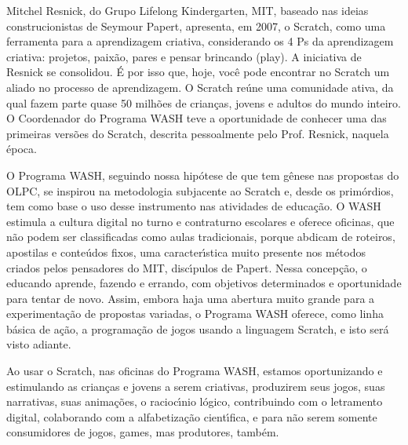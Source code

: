 \documentclass[
12pt,		%
openright,	%
twoside,  %
a4paper,			%
chapter=TITLE,		%
english,			%
french,				%
spanish,			%
brazil				%
]{USPSC-classe/USPSC}
\begin{document}
Mitchel Resnick, do Grupo Lifelong Kindergarten, MIT, baseado nas ideias construcionistas de Seymour Papert, apresenta, em 2007, o Scratch, como uma ferramenta para a aprendizagem criativa, considerando os 4 Ps da aprendizagem criativa: projetos, paix\~ao, pares e pensar brincando (play). A iniciativa de Resnick se consolidou. \'E por isso que, hoje, voc\^e pode encontrar no Scratch um aliado no processo de aprendizagem. O Scratch re\'une uma comunidade ativa, da qual fazem parte quase 50 milh\~oes de crian\c{c}as, jovens e adultos do mundo inteiro. O Coordenador do Programa WASH teve a oportunidade de conhecer uma das primeiras vers\~oes do Scratch, descrita pessoalmente pelo Prof. Resnick, naquela \'epoca.

















O Programa WASH, seguindo nossa hip\'otese de que tem g\^enese nas propostas do OLPC, se inspirou na metodologia subjacente ao Scratch e, desde os prim\'ordios, tem como base o uso desse instrumento nas atividades de educa\c{c}\~ao. O WASH estimula a cultura digital no turno e contraturno escolares e oferece oficinas, que n\~ao podem ser classificadas como aulas tradicionais, porque abdicam de roteiros, apostilas e conte\'udos fixos, uma caracter\'{\i}stica muito presente nos m\'etodos criados pelos pensadores do MIT, disc\'{\i}pulos de Papert. Nessa concep\c{c}\~ao, o educando aprende, fazendo e errando, com objetivos determinados e oportunidade para tentar de novo. Assim, embora haja uma abertura muito grande para a experimenta\c{c}\~ao de propostas variadas, o Programa WASH oferece, como linha b\'asica de a\c{c}\~ao, a programa\c{c}\~ao de jogos usando a linguagem Scratch, e isto ser\'a visto adiante.

















Ao usar o Scratch, nas oficinas do Programa WASH, estamos oportunizando e estimulando \textquotedbl as crian\c{c}as e jovens a serem criativas, produzirem seus jogos, suas narrativas, suas anima\c{c}\~oes, o racioc\'{\i}nio l\'ogico, contribuindo com o letramento digital, colaborando com a alfabetiza\c{c}\~ao cient\'{\i}fica, e para n\~ao serem somente consumidores de jogos, games, mas produtores, tamb\'em\textquotedbl .
\end{document}
